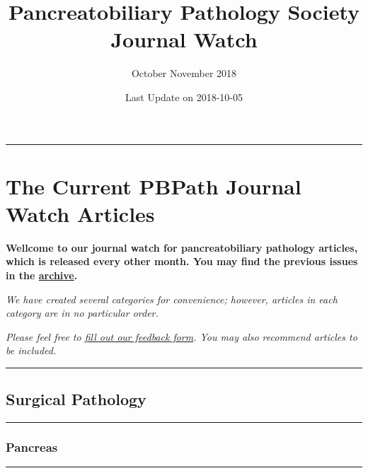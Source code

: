 \documentclass[]{article}
\title{Pancreatobiliary Pathology Society Journal Watch}
\subtitle{October November 2018}
\author{}
\date{Last Update on 2018-10-05}
\begin{document}
\maketitle

{
\setcounter{tocdepth}{5}
\tableofcontents
}
\begin{center}\rule{0.5\linewidth}{\linethickness}\end{center}

\hypertarget{the-current-pbpath-journal-watch-articles}{%
\section{The Current PBPath Journal Watch
Articles}\label{the-current-pbpath-journal-watch-articles}}

\textbf{Wellcome to our journal watch for pancreatobiliary pathology
articles, which is released every other month. You may find the previous
issues in the \href{http://pbpath.org/journal-watch-archive/}{archive}.}

\emph{We have created several categories for convenience; however,
articles in each category are in no particular order.}

\emph{Please feel free to
\href{https://docs.google.com/forms/d/e/1FAIpQLSeD3Z9J6Y7eMmiyM12f_SfAmHUlykb1zxZcwO6lg7cebGYQIQ/viewform}{fill
out our feedback form}. You may also recommend articles to be included.}

\pagebreak

\begin{center}\rule{0.5\linewidth}{\linethickness}\end{center}

\hypertarget{surgical-pathology}{%
\subsection{Surgical Pathology}\label{surgical-pathology}}

\begin{center}\rule{0.5\linewidth}{\linethickness}\end{center}

\hypertarget{pancreas}{%
\subsubsection{Pancreas}\label{pancreas}}

\begin{center}\rule{0.5\linewidth}{\linethickness}\end{center}
\end{document}
